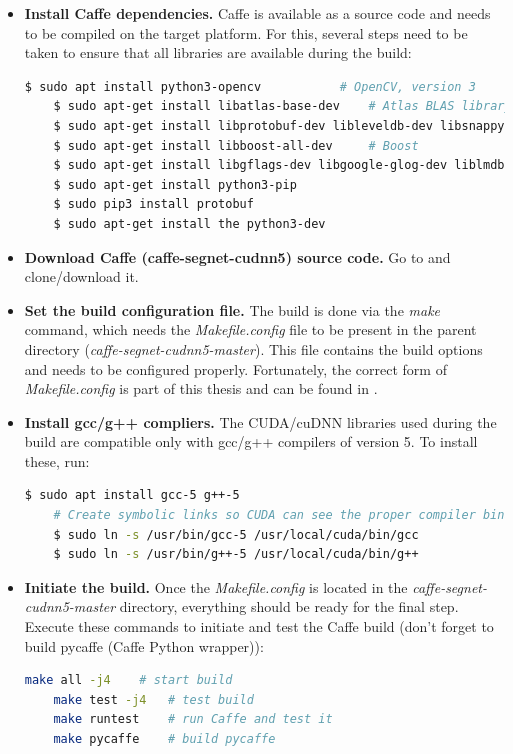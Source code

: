 \newpage
\begin{itemize}
		
	\item \textbf{Install Caffe dependencies.} Caffe is available as a source code and needs to be compiled on the target platform. For this, several steps need to be taken to ensure that all libraries are available during the build: \cite{caffe}
	
	\begin{lstlisting}[language=bash]
	$ sudo apt install python3-opencv 			# OpenCV, version 3
	$ sudo apt-get install libatlas-base-dev 	# Atlas BLAS library
	$ sudo apt-get install libprotobuf-dev libleveldb-dev libsnappy-dev libopencv-dev libhdf5-serial-dev protobuf-compiler
	$ sudo apt-get install libboost-all-dev		# Boost
	$ sudo apt-get install libgflags-dev libgoogle-glog-dev liblmdb-dev
	$ sudo apt-get install python3-pip
	$ sudo pip3 install protobuf
	$ sudo apt-get install the python3-dev
	\end{lstlisting}
	
	\item \textbf{Download Caffe (caffe-segnet-cudnn5) source code.} Go to \cite{filip_github_caffe} and clone/download it. 
	\item \textbf{Set the build configuration file.} The build is done via the \textit{make} command, which needs the \textit{Makefile.config} file to be present in the parent directory (\textit{caffe-segnet-cudnn5-master}). This file contains the build options and needs to be configured properly. Fortunately, the correct form of \textit{Makefile.config} is part of this thesis and can be found in \cite{filip_github_caffe}. 
	
	\item \textbf{Install gcc/g++ compliers.} The CUDA/cuDNN libraries used during the build are compatible only with gcc/g++ compilers of version 5. To install these, run:
	
	\begin{lstlisting}[language=bash]
	$ sudo apt install gcc-5 g++-5
	# Create symbolic links so CUDA can see the proper compiler binaries
	$ sudo ln -s /usr/bin/gcc-5 /usr/local/cuda/bin/gcc
	$ sudo ln -s /usr/bin/g++-5 /usr/local/cuda/bin/g++
	\end{lstlisting}
	
	\item \textbf{Initiate the build.} Once the \textit{Makefile.config} is located in the \textit{caffe-segnet-cudnn5-master} directory, everything should be ready for the final step. Execute these commands to initiate and test the Caffe build (don't forget to build pycaffe (Caffe Python wrapper)):
	
	\begin{lstlisting}[language=bash]
	make all -j4	# start build
	make test -j4	# test build
	make runtest	# run Caffe and test it
	make pycaffe	# build pycaffe 
	\end{lstlisting} 	
\end{itemize}





